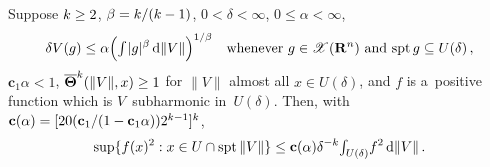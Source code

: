 \begin{theorem}
    \label{al:7.5(6)}
    Suppose $k \ge 2$, $\beta = k/(k-1)$, $0 < \delta < \infty$, $0 \le \alpha < \infty$,
    \begin{displaymath}
        \delta V(g) \le \alpha \Big( {\textstyle\int_{}^{}} |g|^\beta \,\mathrm{d} \|V\| \Big)^{1/\beta} \quad
        \text{whenever $g \in \mathscr{X}(\mathbf{R}^{n})$ and $\operatorname{spt} g \subseteq U(\delta)$} \,,
    \end{displaymath}
    $\mathbf{c}_1 \alpha < 1$, $\boldsymbol{\overline{\Theta}}^{k}(\|V\|,x) \ge 1$ for $\|V\|$ almost all $x \in
    U(\delta)$, and $f$ is a~positive function which is $V$~subharmonic in~$U(\delta)$. Then, with
    $\mathbf{c}(\alpha) = [20 (\mathbf{c}_1 / (1 - \mathbf{c}_1 \alpha)) 2^{k-1}]^{k}$,
    \begin{displaymath}
        \sup \{ f(x)^2 : x \in U \cap \operatorname{spt} \|V\| \} \le \mathbf{c}(\alpha) \delta^{-k}
        {\textstyle\int_{U(\delta)}^{}} f^2 \,\mathrm{d} \|V\| \,.
    \end{displaymath}
\end{theorem}

